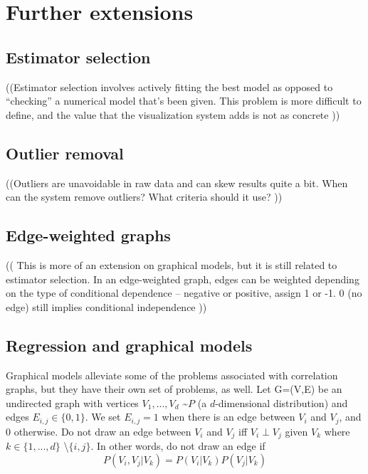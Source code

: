 \section{Further extensions}

\subsection{Estimator selection}

((Estimator selection involves actively fitting the best model as opposed to ``checking'' a numerical model that’s been given. This problem is more difficult to define, and the value that the visualization system adds is not as concrete ))

\subsection{Outlier removal}

((Outliers are unavoidable in raw data and can skew results quite a bit. When can the system remove outliers? What criteria should it use? ))

\subsection{Edge-weighted graphs}

(( This is more of an extension on graphical models, but it is still related to estimator selection. In an edge-weighted graph, edges can be weighted depending on the type of conditional dependence – negative or positive, assign 1 or -1. 0 (no edge) still implies conditional independence ))

\subsection{Regression and graphical models}

Graphical models alleviate some of the problems associated with correlation graphs, but they have their own set of problems, as well. Let G=(V,E) be an undirected graph with vertices $V_1,...,V_d$ \textasciitilde $P$ (a $d$-dimensional distribution) and edges $E_{i,j}\in\{0,1\}$. We set $E_{i,j}=1$ when there is an edge between $V_i$ and $V_j$, and 0 otherwise. Do not draw an edge between $V_i$ and $V_j$ iff $V_i \perp V_j$ given $V_k$ where $k\in\{1,...,d\}$ \textbackslash $\{i,j\}$. In other words, do not draw an edge if
$$P(V_i,V_j|V_k)=P(V_i|V_k)P(V_j|V_k)$$

